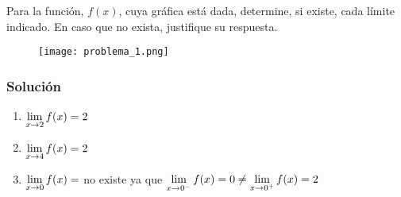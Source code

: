 Para la función, $f(x)$, cuya gráfica está dada, determine, si existe, cada límite indicado. En caso que no exista, justifique su respuesta.

\begin{figure}[H]
    \centering
    \texttt{[image: problema\_1.png]}
    \label{fig:problema_1}
\end{figure}

\begin{soluciones}
    \subsubsection*{Solución}

    \begin{enumerate}[label=\alph*)]
        \item $\displaystyle\lim_{x \rightarrow 2} f(x)=2$
        \item $\displaystyle\lim_{x \rightarrow 4} f(x)=2$
        \item $\displaystyle\lim_{x \rightarrow 0} f(x)=$ no existe ya que $\displaystyle\lim_{x \rightarrow 0^{-}} f(x)=0 \neq \displaystyle\lim_{x \rightarrow 0^{+}} f(x)=2$
    \end{enumerate}
\end{soluciones}